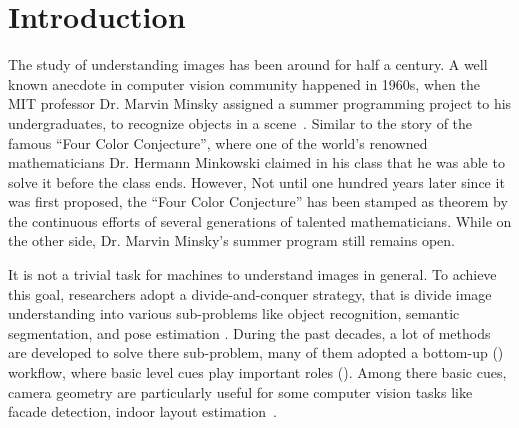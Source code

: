 \chapter{Introduction}
\label{chap:intro}

\makeatletter
\newenvironment{chapquote}[2][2em]
{\setlength{\@tempdima}{#1} \def\chapquote@author{#2} \parshape 1
  \@tempdima \dimexpr\textwidth-2\@tempdima\relax \itshape}
{\par\normalfont\hfill--\
\chapquote@author\hspace*{\@tempdima}\par\bigskip}
\makeatother



The study of understanding images has been around for half a century.
A well known anecdote in computer vision community happened in 1960s,
when the MIT professor Dr. Marvin Minsky assigned a summer programming
project to his undergraduates, to recognize objects in a
scene~\cite{boden2006mind}. 
%
Similar to the story of the famous ``Four Color Conjecture'', where
one of the world's renowned mathematicians Dr. Hermann Minkowski
claimed in his class that he was able to solve it before the class
ends.  
However, Not until one hundred years later since it was first
proposed, the ``Four Color Conjecture'' has been stamped as theorem by
the continuous efforts of several generations of talented
mathematicians.  While on the other side, Dr. Marvin Minsky's summer
program still remains open.

It is not a trivial task for machines to understand images in general.
To achieve this goal, researchers adopt a divide-and-conquer strategy,
that is divide image understanding into various sub-problems like
object recognition, semantic segmentation, and pose estimation \etc.
During the past decades, a lot of methods are developed to solve there
sub-problem, many of them adopted a bottom-up (\todo{citations})
workflow, where basic level cues play important roles
(). Among there basic cues, camera geometry are
particularly useful for some computer vision tasks like facade
detection, indoor layout estimation~\cite{ren2016coarse}.

